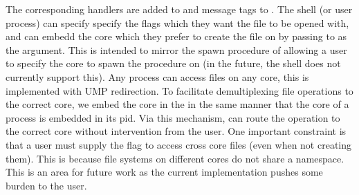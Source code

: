 The corresponding handlers are added to  and message tags to . The shell (or user process) can specify 
specify the flags which they want the file to be opened with, and can embedd the core which they
prefer to create the file on by passing  to  as the  argument. This is intended to mirror
the spawn procedure of allowing a user to specify the core to spawn the procedure on (in the future, the shell does not currently support this). Any process can access files on any core, this is implemented with UMP redirection. To facilitate
demultiplexing file operations to the correct core, we embed the core in the  in the same manner
that the core of a process is embedded in its pid. Via this mechanism,  can route the operation to the correct
core without intervention from the user. One important constraint is that a user must supply the  flag to access 
cross core files (even when not creating them). This is because file systems on different cores do not share a namespace. This is 
an area for future work as the current implementation pushes some burden to the user.
